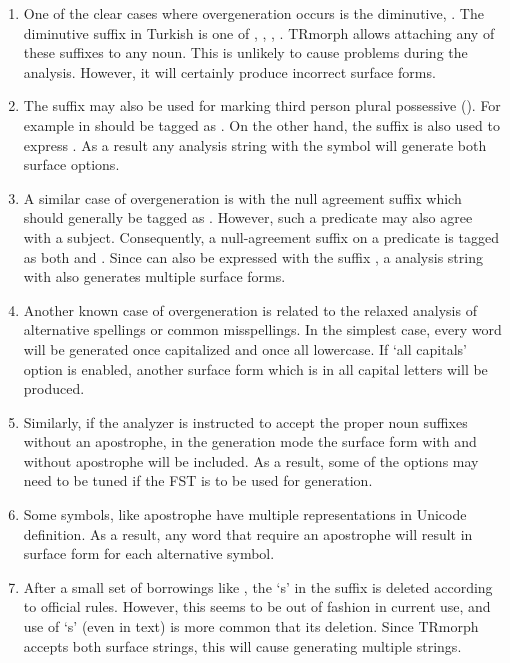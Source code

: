 \documentclass[twocolumn]{article}
\begin{document}
\begin{enumerate}
\item One of the clear cases where overgeneration occurs is
the diminutive, . The diminutive suffix in Turkish is one of
, , , . TRmorph allows
attaching any of these suffixes to any noun. This is
unlikely to cause problems during the analysis. However, it will
certainly produce incorrect surface forms.

\item The  suffix  may also be used for marking
third person plural possessive (). For example 
in  should be
tagged as . On the other hand, the suffix  is
also used to express . As a result any analysis string with
the symbol  will generate both surface options.

\item A similar case of overgeneration is with the null agreement
suffix which should generally be tagged as . However, such a predicate may
also agree with a  subject. Consequently, a null-agreement
suffix on a predicate is tagged as both  and . Since
 can also be expressed with the suffix , a analysis
string with  also generates multiple surface forms.

\item Another known case of overgeneration is related to the relaxed
analysis of alternative spellings or common misspellings. In the simplest case, every
word will be generated once capitalized and once all lowercase. If
`all capitals' option is enabled, another surface form which is in all
capital letters will be produced. 

\item Similarly, if the analyzer is instructed to accept the proper
noun suffixes without an apostrophe, in the generation mode the surface
form with and without apostrophe will be included. As a result, some
of the options may need to be tuned if the FST is to be used for
generation.

\item Some symbols, like apostrophe have multiple representations in
Unicode definition. As a result, any word that require an apostrophe
will result in surface form for each alternative symbol.

\item After a small set of borrowings like , the
`s' in the suffix  is deleted according to official rules.
However, this seems to be out of fashion in current use, and use of
`s' (even in text) is more common that its deletion. Since TRmorph
accepts both surface strings, this will cause generating multiple
strings.


\end{enumerate}
\end{document}
